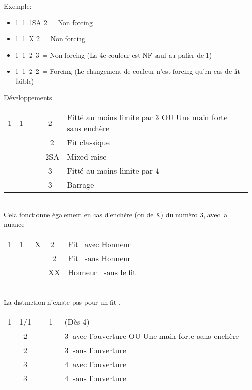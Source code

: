 \documentclass[a4paper, oneside, 11pt]{report}
\begin{document}
	Exemple:
	\begin{itemize}
	\item 1\trefle\ 1\pique\ 1SA 2\carreau\ = Non forcing
	\item 1\trefle\ 1\pique\ X 2\carreau\ = Non forcing
	\item 1\trefle\ 1\pique\ 2\coeur\ 3\carreau\ = Non forcing (La 4e couleur est NF sauf au palier de 1)
	\item 1\trefle\ 1\pique\ 2\trefle\ 2\carreau\ = Forcing (Le changement de couleur n'est forcing qu'en cas de fit faible)\\
	\end{itemize}

	\underline{Développements}\\
	\begin{tabular}{cccc|l}
	1\carreau & 1\coeur\  & - & 2\carreau\ & Fitté au moins limite par 3 OU Une main forte sans enchère\\
	&&& 2\coeur & Fit classique\\
	&&& 2SA & Mixed raise\\
	&&& 3\carreau\ & Fitté au moins limite par 4\\
	&&& 3\coeur\ & Barrage\\
	\end{tabular}\\
	Cela fonctionne également en cas d'enchère (ou de X) du numéro 3, avec la nuance\\

	\begin{tabular}{cccc|l}
	1\carreau & 1\pique\  & X & 2\coeur\ & Fit \pique\ avec Honneur \pique\\
	&&& 2\pique & Fit \pique\ sans Honneur \pique\\
	&&& XX & Honneur \pique\ sans le fit\\
	\end{tabular}\\
	La distinction n'existe pas pour un fit \coeur.\\

	\begin{tabular}{cccc|l}
	1\trefle & 1\carreau/1\coeur  & - & 1\pique\ & (Dès 4\pique)\\
	- & 2\trefle &&& 3\pique\ avec l'ouverture OU Une main forte sans enchère\\
	& 2\pique &&& 3\pique\ sans l'ouverture\\
	& 3\trefle &&& 4\pique\ avec l'ouverture\\
	& 3\pique &&& 4\pique\ sans l'ouverture\\
	\end{tabular}\\\\
\end{document}
